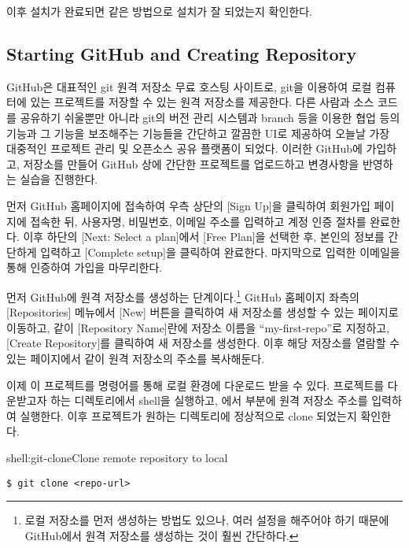 이후 설치가 완료되면 \과 같은 방법으로 설치가 잘 되었는지 확인한다.
\clearpage

\subsection*{Starting GitHub and Creating Repository}

GitHub은 대표적인 git 원격 저장소 무료 호스팅 사이트로, git을 이용하여 로컬 컴퓨터에 있는 프로젝트를 저장할 수 있는 원격 저장소를 제공한다. 다른 사람과 소스 코드를 공유하기 쉬울뿐만 아니라 git의 버전 관리 시스템과 branch 등을 이용한 협업 등의 기능과 그 기능을 보조해주는 기능들을 간단하고 깔끔한 UI로 제공하여 오늘날 가장 대중적인 프로젝트 관리 및 오픈소스 공유 플랫폼이 되었다. 이러한 GitHub에 가입하고, 저장소를 만들어 GitHub 상에 간단한 프로젝트를 업로드하고 변경사항을 반영하는 실습을 진행한다.

먼저 GitHub 홈페이지에 접속하여 우측 상단의 [Sign Up]을 클릭하여 회원가입 페이지에 접속한 뒤, 사용자명, 비밀번호, 이메일 주소를 입력하고 계정 인증 절차를 완료한다. 이후 하단의 [Next: Select a plan]에서 [Free Plan]을 선택한 후, 본인의 정보를 간단하게 입력하고 [Complete setup]을 클릭하여 완료한다. 마지막으로 입력한 이메일을 통해 인증하여 가입을 마무리한다.

먼저 GitHub에 원격 저장소를 생성하는 단계이다.\footnote{로컬 저장소를 먼저 생성하는 방법도 있으나, 여러 설정을 해주어야 하기 때문에 GitHub에서 원격 저장소를 생성하는 것이 훨씬 간단하다.} GitHub 홈페이지 좌측의 [Repositories] 메뉴에서 [New] 버튼을 클릭하여 새 저장소를 생성할 수 있는 페이지로 이동하고, \와 같이 [Repository Name]란에 저장소 이름을 ``my-first-repo''로 지정하고, [Create Repository]를 클릭하여 새 저장소를 생성한다. 이후 해당 저장소를 열람할 수 있는 페이지에서 \과 같이 원격 저장소의 주소를 복사해둔다.


이제 이 프로젝트를  명령어를 통해 로컬 환경에 다운로드 받을 수 있다. 프로젝트를 다운받고자 하는 디렉토리에서 shell을 실행하고, 에서  부분에 원격 저장소 주소를 입력하여 실행한다. 이후 프로젝트가 원하는 디렉토리에 정상적으로 clone 되었는지 확인한다.

\begin{shellenv}{shell:git-clone}{Clone remote repository to local}\begin{verbatim}
$ git clone <repo-url>
\end{verbatim}
\end{shellenv}
\clearpage

